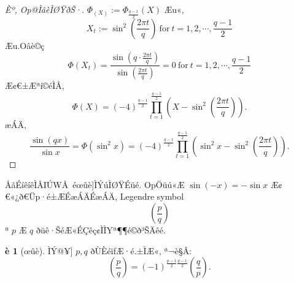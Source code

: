 \documentclass{jsarticle}
\theoremstyle{definition}
\newtheorem*{theorem*}{è}
\begin{document}
\begin{proof}[Èº, Op@ÌâèÌØŸðŠ·] $\Phi_(X):=\Phi_{\frac{q-1}{2}}(X)$ Æu«,
\[
X_t:=\sin^2\left(\frac{2\pi t}{q}\right)\ \mathrm{for}\ t=1,2,\cdots,\frac{q-1}{2}
\]
Æu­.Oâè©ç
\[
\Phi(X_t)=\frac{\sin\left(q\cdot\frac{2\pi t}{q}\right)}{\sin\left(\frac{2\pi t}{q}\right)}=0\ \mathrm{for}\ t=1,2,\cdots,\frac{q-1}{2}
\]
Æ¢€±Æªí©éÌÅ,
\[
\Phi(X)=(-4)^{\frac{q-1}{2}}\prod_{t=1}^{\frac{q-1}{2}}\left(X-\sin^2\left(\frac{2\pi t}{q}\right)\right).
\]
æÁÄ,
\[
\frac{\sin (qx)}{\sin x}=\Phi(\sin^2 x)=(-4)^{\frac{q-1}{2}}\prod_{t=1}^{\frac{q-1}{2}}\left(\sin^2 x-\sin^2\left(\frac{2\pi t}{q}\right)\right).
\]
\end{proof}

ÅãÉíêíêÌÅIÚWÅ éœûè]ÌÝúÌØŸÉüé.
OpÖüú«Æ $\sin (-x)=-\sin x$ Æ¢€«¿ð€Ü­p·é±ÆÉæÁÄÉæÁÄ, Legendre symbol
\[
\left(\frac{p}{q}\right)
\]
ª $p$ Æ $q$ ðüê·ŠéÆ«ÉÇê­ç¢ÌÌYª¶¶é©ð³ŠÄ­êé.
\newpage
\begin{theorem*}[œûè]ÌÝ@¥]
$p,q$ ðÙÈéïfÆ·é.±ÌÆ«, ª¬è§Â:
\[
\left(\frac{p}{q}\right)=(-1)^{\frac{p-1}{2}\frac{q-1}{2}}\left(\frac{q}{p}\right).
\]
\end{theorem*}
\end{document}
